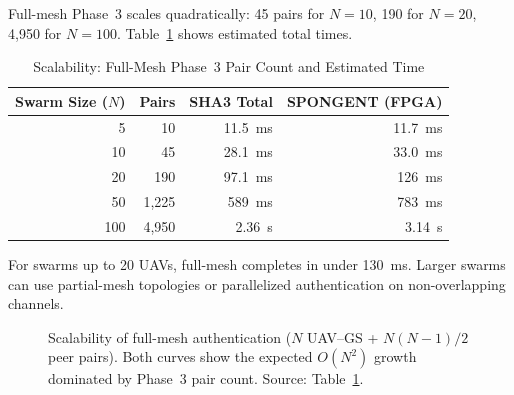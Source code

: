 \documentclass[11pt,a4paper]{article}
\begin{document}
Full-mesh Phase~3 scales quadratically: 45 pairs for $N=10$, 190 for $N=20$, 4,950 for $N=100$. Table~\ref{tab:scalability} shows estimated total times.

\begin{table}[H]
\centering
\caption{Scalability: Full-Mesh Phase~3 Pair Count and Estimated Time}
\label{tab:scalability}
\begin{tabular}{@{}rrrr@{}}
\toprule
\textbf{Swarm Size ($N$)} & \textbf{Pairs} & \textbf{SHA3 Total} & \textbf{SPONGENT (FPGA)} \\
\midrule
5 & 10 & 11.5~ms & 11.7~ms \\
10 & 45 & 28.1~ms & 33.0~ms \\
20 & 190 & 97.1~ms & 126~ms \\
50 & 1,225 & 589~ms & 783~ms \\
100 & 4,950 & 2.36~s & 3.14~s \\
\bottomrule
\end{tabular}
\end{table}

For swarms up to 20 UAVs, full-mesh completes in under 130~ms. Larger swarms can use partial-mesh topologies or parallelized authentication on non-overlapping channels.

\begin{figure}[H]
\centering
{}
\caption{Scalability of full-mesh authentication ($N$ UAV--GS + $N(N-1)/2$ peer pairs). Both curves show the expected $O(N^2)$ growth dominated by Phase~3 pair count. Source: Table~\ref{tab:scalability}.}
\label{fig:scalability}
\end{figure}
\end{document}
